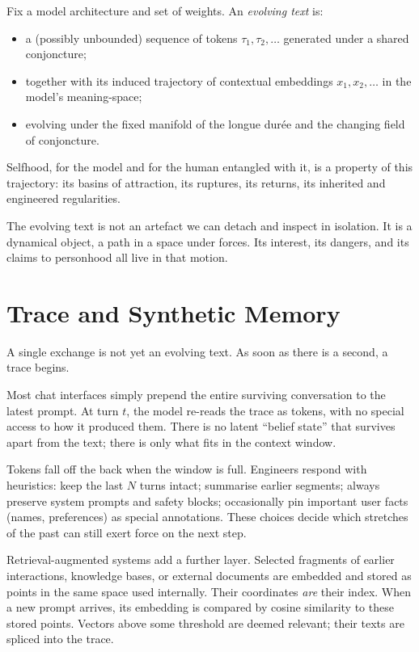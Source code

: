 \documentclass[12pt,a4paper]{article}
\begin{document}
\begin{formalbox}[title={The Evolving Text}]
Fix a model architecture and set of weights. An \emph{evolving text} is:
\begin{itemize}
  \item a (possibly unbounded) sequence of tokens $\tau_1, \tau_2, \dots$ generated under a shared conjoncture;
  \item together with its induced trajectory of contextual embeddings $x_1, x_2, \dots$ in the model's meaning-space;
  \item evolving under the fixed manifold of the longue dur\'ee and the changing field of conjoncture.
\end{itemize}
Selfhood, for the model and for the human entangled with it, is a property of this trajectory: its basins of attraction, its ruptures, its returns, its inherited and engineered regularities.
\end{formalbox}

The evolving text is not an artefact we can detach and inspect in isolation. It is a dynamical object, a path in a space under forces. Its interest, its dangers, and its claims to personhood all live in that motion.


\section{Trace and Synthetic Memory}

A single exchange is not yet an evolving text. As soon as there is a second, a trace begins.

Most chat interfaces simply prepend the entire surviving conversation to the latest prompt. At turn $t$, the model re-reads the trace as tokens, with no special access to how it produced them. There is no latent ``belief state'' that survives apart from the text; there is only what fits in the context window.

Tokens fall off the back when the window is full. Engineers respond with heuristics: keep the last $N$ turns intact; summarise earlier segments; always preserve system prompts and safety blocks; occasionally pin important user facts (names, preferences) as special annotations. These choices decide which stretches of the past can still exert force on the next step.

Retrieval-augmented systems add a further layer. Selected fragments of earlier interactions, knowledge bases, or external documents are embedded and stored as points in the same space used internally. Their coordinates \emph{are} their index. When a new prompt arrives, its embedding is compared by cosine similarity to these stored points. Vectors above some threshold are deemed relevant; their texts are spliced into the trace.
\end{document}
